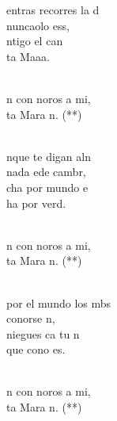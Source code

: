 \documentclass[12pt]{article}
\begin{document}
\begin{multicols*}{2}
\begin{cancion}%
	entras recorres la d\\
	 nuncaolo ess, \\
	ntigo  el can\\
	ta Maaa.\\\jump\\
	\begin{chorus}%
	n con noros a mi,\\
	ta Mara n. (**)\\
	\end{chorus}%
	\jump\\
	nque te digan aln\\
	 nada ede cambr,\\
	cha por mundo e\\
	ha por verd.\\\jump\\
	\begin{chorus}%
	n con noros a mi,\\
	ta Mara n. (**)\\
	\end{chorus}%
	\jump\\
	 por el mundo los mbs\\
	 conorse n,\\
	 niegues ca tu n\\
	que cono es. \\\jump\\
	\begin{chorus}%
	n con noros a mi,\\
	ta Mara n. (**)\\

\end{chorus}
\end{cancion}
\end{multicols*}
\end{document}
